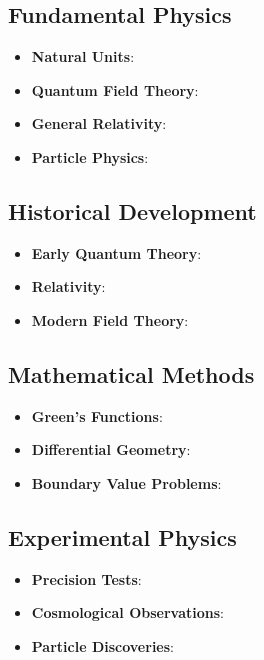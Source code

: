 \documentclass[12pt,a4paper]{article}
\begin{document}
	\subsection*{Fundamental Physics}
	\begin{itemize}
		\item \textbf{Natural Units}: \citet{planck1900,planck1906,weinberg1995,peskin1995}
		\item \textbf{Quantum Field Theory}: \citet{weinberg1995,peskin1995,srednicki2007,zee2010}
		\item \textbf{General Relativity}: \citet{einstein1915,misner1973,carroll2004,wald1984}
		\item \textbf{Particle Physics}: \citet{griffiths2008,perkins2000,weinberg2003}
	\end{itemize}
	
	\subsection*{Historical Development}
	\begin{itemize}
		\item \textbf{Early Quantum Theory}: \citet{planck1900,bohr1913,heisenberg1927,debroglie1924}
		\item \textbf{Relativity}: \citet{einstein1905,einstein1915,schwarzschild1916}
		\item \textbf{Modern Field Theory}: \citet{weinberg1967,salam1968,higgs1964,englert1964}
	\end{itemize}
	
	\subsection*{Mathematical Methods}
	\begin{itemize}
		\item \textbf{Green's Functions}: \citet{jackson1998,duffy2001,roach1982}
		\item \textbf{Differential Geometry}: \citet{misner1973,abraham1988}
		\item \textbf{Boundary Value Problems}: \citet{stakgold1998,haberman2004}
	\end{itemize}
	
	\subsection*{Experimental Physics}
	\begin{itemize}
		\item \textbf{Precision Tests}: \citet{will2014,adelberger2003,murphy2003}
		\item \textbf{Cosmological Observations}: \citet{planck2020,weinberg2008}
		\item \textbf{Particle Discoveries}: \citet{aad2012,chatrchyan2012,abbott2017}
	\end{itemize}
	
\end{document}
